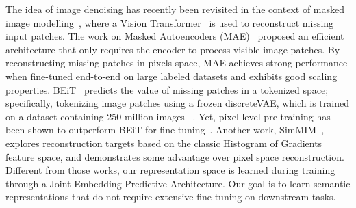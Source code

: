 \documentclass[10pt,twocolumn,letterpaper]{article}
\begin{document}
The idea of image denoising has recently been revisited in the context of masked image modelling~\cite{he2021masked, xie2021simmim, bao2021beit}, where a Vision Transformer~\cite{dosovitskiy2020image} is used to reconstruct missing input patches.
The work on Masked Autoencoders (MAE)~\cite{he2021masked} proposed an efficient architecture that only requires the encoder to process visible image patches.
By reconstructing missing patches in pixels space, MAE achieves strong performance when fine-tuned end-to-end on large labeled datasets and exhibits good scaling properties.
 BEiT~\cite{bao2021beit} predicts the value of missing patches in a tokenized space; specifically, tokenizing image patches using a frozen discreteVAE, which is trained on a dataset containing 250 million images ~\cite{ramesh2021zero}.
Yet, pixel-level pre-training has been shown to outperform BEiT for fine-tuning~\cite{he2021masked}.
Another work, SimMIM~\cite{xie2021simmim}, explores reconstruction targets based on the classic Histogram of Gradients~\cite{dalal2005histograms} feature space, and demonstrates some advantage over pixel space reconstruction.
Different from those works, our representation space is learned during training through a Joint-Embedding Predictive Architecture.
Our goal is to learn semantic representations that do not require extensive fine-tuning on downstream tasks.
\end{document}
